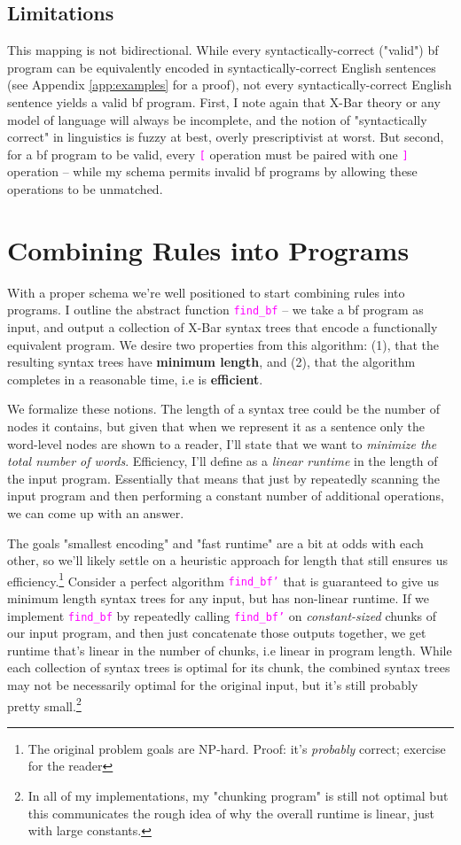 \documentclass[runningheads]{llncs}
\newcommand{\code}[1]{\texttt{\textcolor{magenta}{\setlength{\fboxsep}{1pt}\colorbox{lightgray!20}{#1}}}}
\begin{document}
\subsection{Limitations}
This mapping is not bidirectional. While every syntactically-correct ("valid") bf program can be equivalently encoded in syntactically-correct English sentences (see Appendix \ref{app:examples} for a proof), not every syntactically-correct English sentence yields a valid bf program. First, I note again that X-Bar theory or any model of language will always be incomplete, and the notion of "syntactically correct" in linguistics is fuzzy at best, overly prescriptivist at worst. But second, for a bf program to be valid, every \code{[} operation must be paired with one \code{]} operation -- while my schema permits invalid bf programs by allowing these operations to be unmatched.
\section{Combining Rules into Programs}
With a proper schema we're well positioned to start combining rules into programs. I outline the abstract function \code{find\_bf} -- we take a bf program as input, and output a collection of X-Bar syntax trees that encode a functionally equivalent program. We desire two properties from this algorithm: (1), that the resulting syntax trees have \textbf{minimum length}, and (2), that the algorithm completes in a reasonable time, i.e is \textbf{efficient}.

We formalize these notions. The length of a syntax tree could be the number of nodes it contains, but given that when we represent it as a sentence only the word-level nodes are shown to a reader, I'll state that we want to \textit{minimize the total number of words}. Efficiency, I'll define as a \textit{linear runtime} in the length of the input program. Essentially that means that just by repeatedly scanning the input program and then performing a constant number of additional operations, we can come up with an answer.

The goals "smallest encoding" and "fast runtime" are a bit at odds with each other, so we'll likely settle on a heuristic approach for length that still ensures us efficiency.\footnote{The original problem goals are  NP-hard. Proof: it's \textit{probably} correct; exercise for the reader} Consider a perfect algorithm \code{find\_bf'} that is guaranteed to give us minimum length syntax trees for any input, but has non-linear runtime. If we implement \code{find\_bf} by repeatedly calling \code{find\_bf'} on \textit{constant-sized} chunks of our input program, and then just concatenate those outputs together, we get runtime that's linear in the number of chunks, i.e linear in program length. While each collection of syntax trees is optimal for its chunk, the combined syntax trees may not be necessarily optimal for the original input, but it's still probably pretty small.\footnote{In all of my implementations, my "chunking program" is still not optimal but this communicates the rough idea of why the overall runtime is linear, just with large constants.}
\end{document}
